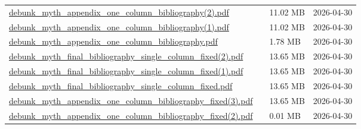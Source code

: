 \documentclass[UTF8,fontset=fandol,10pt,a4paper]{ctexart}
\begin{document}
\begin{longtable}{@{}L{\dimexpr\linewidth-50mm-6\tabcolsep\relax}R{8mm}R{16mm}R{26mm}@{}}
\href{https://chatgpt.com/library?file_id=libfile_edd8c148a0b48191a0638bfd0b55e34a&account_id=personal}{debunk\_\allowbreak{}myth\_\allowbreak{}appendix\_\allowbreak{}one\_\allowbreak{}column\_\allowbreak{}bibliography(2).\allowbreak{}pdf} & \textemdash{} & 11.02 MB & 2026-04-30 \\
\href{https://chatgpt.com/library?file_id=libfile_3eb58b13d1f481919c97ad79e4c2bc18&account_id=personal}{debunk\_\allowbreak{}myth\_\allowbreak{}appendix\_\allowbreak{}one\_\allowbreak{}column\_\allowbreak{}bibliography(1).\allowbreak{}pdf} & \textemdash{} & 11.02 MB & 2026-04-30 \\
\href{https://chatgpt.com/library?file_id=libfile_637cedd67e7481918958268e8a0346bc&account_id=personal}{debunk\_\allowbreak{}myth\_\allowbreak{}appendix\_\allowbreak{}one\_\allowbreak{}column\_\allowbreak{}bibliography.\allowbreak{}pdf} & \textemdash{} & 1.78 MB & 2026-04-30 \\
\href{https://chatgpt.com/library?file_id=libfile_897f4b69eb388191a25640d72f9919b0&account_id=personal}{debunk\_\allowbreak{}myth\_\allowbreak{}final\_\allowbreak{}bibliography\_\allowbreak{}single\_\allowbreak{}column\_\allowbreak{}fixed(2).\allowbreak{}pdf} & \textemdash{} & 13.65 MB & 2026-04-30 \\
\href{https://chatgpt.com/library?file_id=libfile_923f5c694a788191a3a8b75d88e7bd3a&account_id=personal}{debunk\_\allowbreak{}myth\_\allowbreak{}final\_\allowbreak{}bibliography\_\allowbreak{}single\_\allowbreak{}column\_\allowbreak{}fixed(1).\allowbreak{}pdf} & \textemdash{} & 13.65 MB & 2026-04-30 \\
\href{https://chatgpt.com/library?file_id=libfile_eebc828e024c8191a79717fb362239df&account_id=personal}{debunk\_\allowbreak{}myth\_\allowbreak{}final\_\allowbreak{}bibliography\_\allowbreak{}single\_\allowbreak{}column\_\allowbreak{}fixed.\allowbreak{}pdf} & \textemdash{} & 13.65 MB & 2026-04-30 \\
\href{https://chatgpt.com/library?file_id=libfile_3b11514949108191aee065330591826e&account_id=personal}{debunk\_\allowbreak{}myth\_\allowbreak{}appendix\_\allowbreak{}one\_\allowbreak{}column\_\allowbreak{}bibliography\_\allowbreak{}fixed(3).\allowbreak{}pdf} & \textemdash{} & 13.65 MB & 2026-04-30 \\
\href{https://chatgpt.com/library?file_id=libfile_33e699b940708191808073d86cbc39a6&account_id=personal}{debunk\_\allowbreak{}myth\_\allowbreak{}appendix\_\allowbreak{}one\_\allowbreak{}column\_\allowbreak{}bibliography\_\allowbreak{}fixed(2).\allowbreak{}pdf} & \textemdash{} & 0.01 MB & 2026-04-30 \\

\end{longtable}
\end{document}
